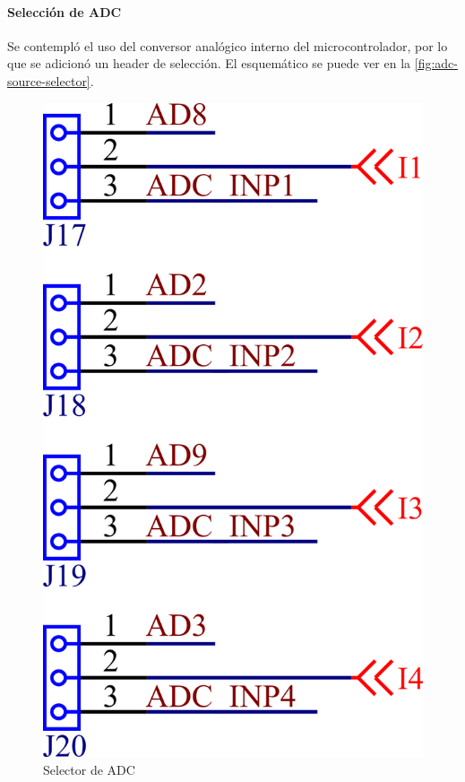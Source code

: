 \documentclass[titlepage, 12pt]{article}
\begin{document}
\paragraph{Selección de ADC}
Se contempló el uso del conversor analógico interno del microcontrolador, por lo que se adicionó un header de selección. El esquemático se puede ver en la \autoref{fig:adc-source-selector}.

    \begin{figure}[!htbp]
        \centering
        \includegraphics[scale=1.5]{images/adc-source-selector.png}
        \caption{Selector de ADC}
        \label{fig:adc-source-selector}
    \end{figure}
\end{document}
